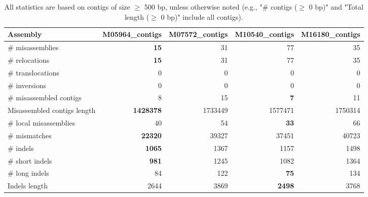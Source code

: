 \documentclass[12pt,a4paper]{article}
\begin{document}
\begin{table}[ht]
\begin{center}
\caption{All statistics are based on contigs of size $\geq$ 500 bp, unless otherwise noted (e.g., "\# contigs ($\geq$ 0 bp)" and "Total length ($\geq$ 0 bp)" include all contigs).}
\begin{tabular}{|l*{4}{|r}|}
\hline
Assembly & M05964\_contigs & M07572\_contigs & M10540\_contigs & M16180\_contigs \\ \hline
\# misassemblies & {\bf 15} & 31 & 77 & 35 \\ \hline
\hspace{5mm}\# relocations & {\bf 15} & 31 & 77 & 35 \\ \hline
\hspace{5mm}\# translocations & 0 & 0 & 0 & 0 \\ \hline
\hspace{5mm}\# inversions & 0 & 0 & 0 & 0 \\ \hline
\# misassembled contigs & 8 & 15 & {\bf 7} & 11 \\ \hline
Misassembled contigs length & {\bf 1428378} & 1733449 & 1577471 & 1750314 \\ \hline
\# local misassemblies & 40 & 54 & {\bf 33} & 66 \\ \hline
\# mismatches & {\bf 22320} & 39327 & 37451 & 40723 \\ \hline
\# indels & {\bf 1065} & 1367 & 1157 & 1498 \\ \hline
\hspace{5mm}\# short indels & {\bf 981} & 1245 & 1082 & 1364 \\ \hline
\hspace{5mm}\# long indels & 84 & 122 & {\bf 75} & 134 \\ \hline
Indels length & 2644 & 3869 & {\bf 2498} & 3768 \\ \hline
\end{tabular}
\end{center}
\end{table}
\end{document}
